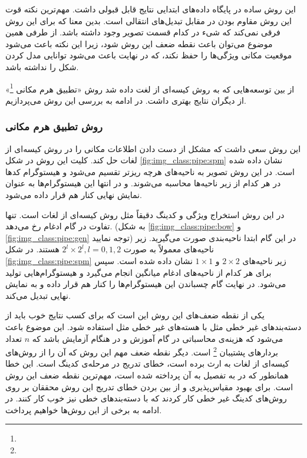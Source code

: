 \documentclass[11pt]{article}
\begin{document}
این روش ساده در پایگاه داده‌های ابتدایی نتایج قابل قبولی داشت. مهم‌ترین نکته قوت این روش مقاوم بودن در مقابل تبدیل‌های انتقالی است. بدین معنا که برای این روش فرقی نمی‌کند که شی‌ء در کدام قسمت تصویر وجود داشته باشد. از طرفی همین موضوع می‌توان باعث نقطه ضعف این روش شود، زیرا این نکته باعث می‌شود موقعیت مکانی ویژگی‌ها را حفظ نکند، که در نهایت باعث می‌شود توانایی مدل کردن شکل را نداشته باشد.

از بین توسعه‌هایی که به روش کیسه‌ای از لغت داده شد
\cite{jurie2005, nn_img_class, berg2005}
روش «تطبیق هرم مکانی
\footnote{}» \cite{spm}
از دیگران نتایج بهتری داشت. در ادامه به بررسی این روش می‌پردازیم.
\subsubsection{روش تطبیق هرم مکانی}
این روش
\cite{spm}
سعی داشت که مشکل از دست دادن اطلاعات مکانی را در روش کیسه‌ای از لغات حل کند. کلیت این روش در شکل
\ref{fig:img_class:pipe:spm}
نشان داده شده است. در این روش تصویر به ناحیه‌های هرچه ریزتر تقسیم می‌شود و هیستوگرام کدها در هر کدام از زیر ناحیه‌ها محاسبه می‌شوند. و در انتها این هیستوگرام‌ها به عنوان نمایش نهایی کنار هم قرار داده می‌شود.

در این روش استخراج ویژگی و کدینگ دقیقاً مثل روش کیسه‌ای از لغات است. تنها تفاوت در گام ادغام رخ می‌دهد. (به شکل
\ref{fig:img_class:pipe:bow} و
\ref{fig:img_class:pipe:gen}
توجه نمایید)
در این گام ابتدا ناحیه‌بندی صورت می‌گیرید. زیر ناحیه‌های معمولاً به صورت
$2 ^ l \times 2 ^ l , l = 0, 1, 2$
هستند. در شکل
\ref{fig:img_class:pipe:spm}
زیر ناحیه‌های
$2 \times 2$ و $1 \times 1$
نشان داده شده است. سپس برای هر کدام از ناحیه‌های ادغام میانگین انجام می‌گیرد و هیستوگرام‌هایی تولید می‌شود. در نهایت گام چسباندن این هیستوگرام‌ها را کنار هم قرار داده و به نمایش نهایی تبدیل می‌کند.

یکی از نقطه ضعف‌های این روش این است که برای کسب نتایج خوب باید از دسته‌بندهای غیر خطی مثل
با هسته‌های غیر خطی مثل
 استفاده شود.
این موضوع باعث می‌شود که هزینه‌ی محاسباتی در گام آموزش
و در هنگام آزمایش
باشد که $n$ تعداد بردارهای پشتیبان
\footnote{}
است. دیگر نقطه ضعف مهم این روش که آن را از روش‌های کیسه‌ای از لغات به ارث برده است، خطای تدریج در مرحله‌ی کدینگ است. این خطا همانطور که در
\cite{nn_img_class}
به تفصیل به آن پرداخته شده است، مهم‌ترین نقطه ضعف این روش است.
برای بهبود مقیاس‌پذیری و از بین بردن خطای تدریج این روش محققان بر روی روش‌های کدینگ غیر خطی کار کردند که با دسته‌بندهای خطی نیز خوب کار کنند. در ادامه به برخی از این روش‌ها خواهیم پرداخت.
\end{document}
